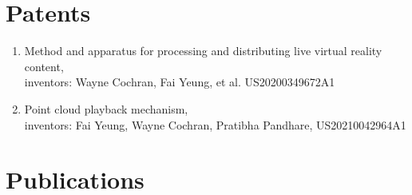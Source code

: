 \documentclass[10pt]{article}
\begin{document}
\section*{Patents}

\begin{enumerate}
\item Method and apparatus for processing and distributing live virtual reality content,\\
   inventors: Wayne Cochran, Fai Yeung, et al.
   US20200349672A1
\item Point cloud playback mechanism,\\
   inventors: Fai Yeung, Wayne Cochran, Pratibha Pandhare,
   US20210042964A1
\end{enumerate}

\section*{Publications}
\end{document}
